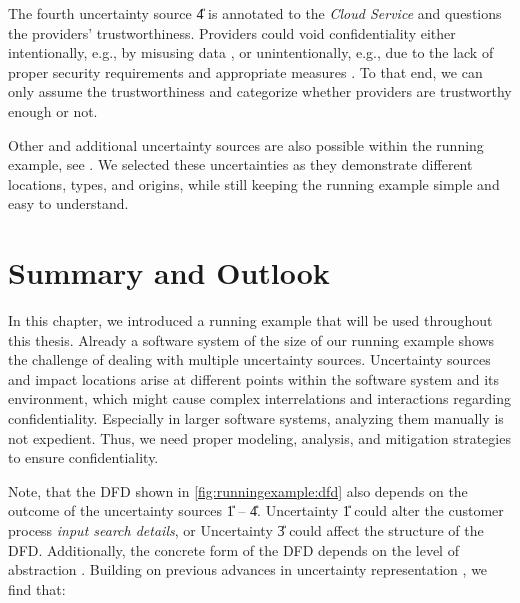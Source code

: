 The fourth uncertainty source \U{4} is annotated to the \emph{Cloud Service} and questions the providers' trustworthiness.
Providers could void confidentiality either intentionally, e.g., by misusing data \cite{costante_privacy-aware_2013}, or unintentionally, e.g., due to the lack of proper security requirements and appropriate measures \cite{firesmith_specifying_2004}.
To that end, we can only assume the trustworthiness and categorize whether providers are trustworthy enough or not.

Other and additional uncertainty sources are also possible within the running example, see \arcen.
We selected these uncertainties as they demonstrate different locations, types, and origins, while still keeping the running example simple and easy to understand.





\section{Summary and Outlook}%
\label{sec:runningexample:summary}

In this chapter, we introduced a running example that will be used throughout this thesis.
Already a software system of the size of our running example shows the challenge of dealing with multiple uncertainty sources.
Uncertainty sources and impact locations arise at different points within the software system and its environment, which might cause complex interrelations and interactions \cite{camara_uncertainty_2024} regarding confidentiality.
Especially in larger software systems, analyzing them manually is not expedient.
Thus, we need proper modeling, analysis, and mitigation strategies to ensure confidentiality.

Note, that the \ac{DFD} shown in \autoref{fig:runningexample:dfd} also depends on the outcome of the uncertainty sources \U{1} -- \U{4}.
Uncertainty \U{1} could alter the customer process \emph{input search details}, or Uncertainty \U{3} could affect the structure of the \ac{DFD}.
Additionally, the concrete form of the \ac{DFD} depends on the level of abstraction \cite{demarco_structure_1979}.
Building on previous advances in uncertainty representation \cite{garlan_software_2010,troya_uncertainty_2021}, we find that:


